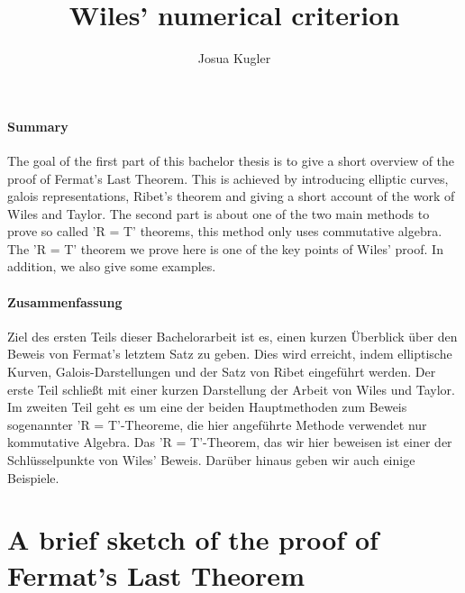 \documentclass{article}
\title{Wiles' numerical criterion}
\author{Josua Kugler}
\theoremstyle{plain}%
\theoremstyle{definition}
\theoremstyle{remark}
\begin{document}
\maketitle

\paragraph{Summary}
The goal of the first part of this bachelor thesis is to give a 
short overview of the proof of Fermat's Last Theorem.
This is achieved by introducing elliptic curves, galois representations, 
Ribet's theorem and giving a short account of the work of Wiles and Taylor.
The second part is about one of the two main methods to prove so called 'R = T' theorems,
this method only uses commutative algebra. The 'R = T' theorem we prove here
is one of the key points of Wiles' proof.
In addition, we also give some examples.

\paragraph{Zusammenfassung}
Ziel des ersten Teils dieser Bachelorarbeit ist es, einen kurzen Überblick 
über den Beweis von Fermat's letztem Satz zu geben.
Dies wird erreicht, indem elliptische Kurven, Galois-Darstellungen und der Satz von Ribet eingeführt werden.
Der erste Teil schließt mit einer kurzen Darstellung der Arbeit von Wiles und Taylor.
Im zweiten Teil geht es um eine der beiden Hauptmethoden zum Beweis sogenannter 'R = T'-Theoreme,
die hier angeführte Methode verwendet nur kommutative Algebra. Das 'R = T'-Theorem, das wir hier beweisen
ist einer der Schlüsselpunkte von Wiles' Beweis. 
Darüber hinaus geben wir auch einige Beispiele.

\newpage
\tableofcontents
\newpage

\section{A brief sketch of the proof of Fermat's Last Theorem}
\end{document}
